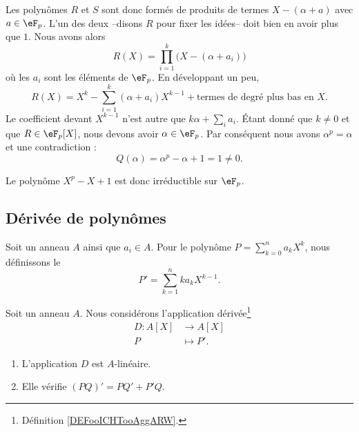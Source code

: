 \begin{example}
	Les polynômes \( R\) et \( S\) sont donc formés de produits de termes \( X-(\alpha+a)\) avec \( a\in \eF_p\). L'un des deux --disons \( R\) pour fixer les idées-- doit bien en avoir plus que \( 1\). Nous avons alors
	\begin{equation}
		R(X)=\prod_{i=1}^{k}\big( X-(\alpha+a_i) \big)
	\end{equation}
	où les \( a_i\) sont les éléments de \( \eF_p\). En développant un peu,
	\begin{equation}
        R(X)=X^k-\sum_{i=1}^k(\alpha+a_i)X^{k-1}+\text{termes de degré plus bas en } X.
	\end{equation}
	Le coefficient devant \( X^{k-1}\) n'est autre que \( k\alpha+\sum_ia_i\). Étant donné que \( k\neq 0\) et que \( R\in \eF_p[X]\), nous devons avoir \( \alpha\in \eF_p\). Par conséquent nous avons \( \alpha^p=\alpha\) et une contradiction :
	\begin{equation}
		Q(\alpha)=\alpha^p-\alpha+1=1\neq 0.
	\end{equation}

	Le polynôme \( X^p-X+1\) est donc irréductible sur \( \eF_p\).
\end{example}


\subsection{Dérivée de polynômes}

\begin{definition}    \label{DEFooICHTooAggARW}
    Soit un anneau \( A\) ainsi que \( a_i\in A\). Pour le polynôme \( P=\sum_{k=0}^na_k X^k\), nous définissons le 
    \begin{equation}
        P'=\sum_{k=1}^nka_kX^{k-1}.
    \end{equation}
\end{definition}

\begin{lemma}        \label{LEMooEFQQooTzDanH}
    Soit un anneau \( A\). Nous considérons l'application dérivée\footnote{Définition \ref{DEFooICHTooAggARW}.}
    \begin{equation}
        \begin{aligned}
            D\colon A[X]&\to A[X] \\
            P&\mapsto P'.
        \end{aligned}
    \end{equation}
    \begin{enumerate}
        \item
            L'application \( D\) est \( A\)-linéaire.
        \item
            Elle vérifie \( (PQ)'=PQ'+P'Q\).
    \end{enumerate}
\end{lemma}

